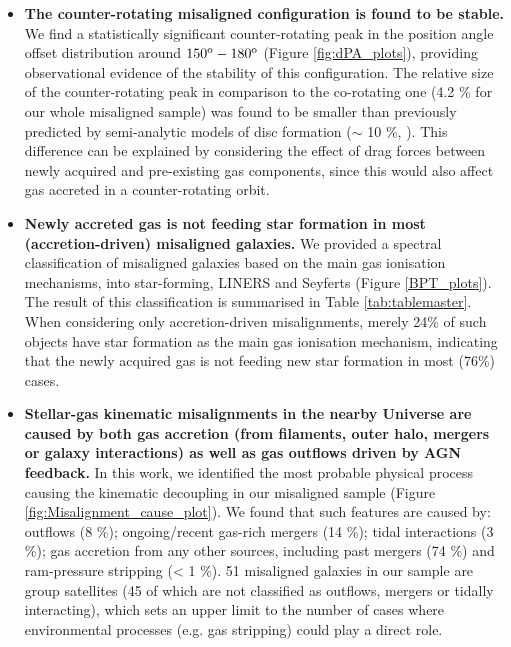 \documentclass[fleqn,usenatbib]{mnras}
\begin{document}
\begin{itemize}
    \item \textbf{The counter-rotating misaligned configuration is found to be stable.} We find a statistically significant counter-rotating peak in the position angle offset distribution around $150^{\rm{o}}-180^{\rm{o}}$ (Figure \ref{fig:dPA_plots}), providing observational evidence of the stability of this configuration. The relative size of the counter-rotating peak in comparison to the co-rotating one (4.2 \% for our whole misaligned sample) was found to be smaller than previously predicted by semi-analytic models of disc formation ($\sim$ 10 \%, \citealt{Stevens2016}). This difference can be explained by considering the effect of drag forces between newly acquired and pre-existing gas components, since this would also affect gas accreted in a counter-rotating orbit. 

    \item \textbf{Newly accreted gas is not feeding star formation in most (accretion-driven) misaligned galaxies.} We provided a spectral classification of misaligned galaxies based on the main gas ionisation mechanisms, into star-forming, LINERS and Seyferts (Figure \ref{BPT_plots}). The result of this classification is summarised in Table \ref{tab:tablemaster}. 
    When considering only accretion-driven misalignments, merely 24\% of such objects have star formation as the main gas ionisation mechanism, indicating that the newly acquired gas is not feeding new star formation in most (76\%) cases.

    \item \textbf{Stellar-gas kinematic misalignments in the nearby Universe are caused by both gas accretion (from filaments, outer halo, mergers or galaxy interactions) as well as gas outflows driven by AGN feedback.} In this work, we identified the most probable physical process causing the kinematic decoupling in our misaligned sample (Figure \ref{fig:Misalignment_cause_plot}). 
    We found that such features are caused by: outflows (8 \%); ongoing/recent gas-rich mergers (14 \%); tidal interactions (3 \%); gas accretion from any other sources, including past mergers (74 \%) and ram-pressure stripping (< 1 \%). 51 misaligned galaxies in our sample are group satellites (45 of which are not classified as outflows, mergers or tidally interacting), which sets an upper limit to the number of cases where environmental processes (e.g. gas stripping) could play a direct role. 
    
\end{itemize}
\end{document}
